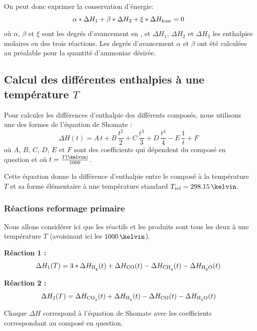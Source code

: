 \documentclass[a4paper,12pt]{article}
\begin{document}
On peut donc exprimer la conservation d'énergie:
$$\alpha*\Delta H_1 + \beta*\Delta H_2 + \xi*\Delta H_{\mbox{\scriptsize{four}}} = 0$$
où $\alpha$, $\beta$ et $\xi$ sont les degrés d'avancement en \mole\per\second,
et $\Delta H_1$, $\Delta H_2$ et $\Delta H_3$ les enthalpies molaires en
\joule\per\mole des trois réactions.
Les degrés d'avancement $\alpha$ et $\beta$ ont été calculées
au préalable pour la quantité d’ammoniac désirée.


\subsection{Calcul des différentes enthalpies à une température $T$}

Pour calculer les différences d'enthalpie des différents composés,
nous utilisons une des formes de l'équation de Shomate \cite{nist}:
$$\Delta H(t) = A\,t + B\,\frac{t^2}{2} + C\,\frac{t^3}{3}
+ D\,\frac{t^4}{4} - E\,\frac{1}{t} + F$$
où $A$, $B$, $C$, $D$, $E$ et $F$ sont des coefficients
qui dépendent du composé en question et où $t=\frac{T(\kelvin)}{1000}$.

Cette équation donne la différence d'enthalpie entre le composé à la température $T$
et sa forme élémentaire à une température standard $T\ind{ref} = 298.15\,\kelvin$.


\subsubsection{Réactions reformage primaire}

Nous allons considérer ici que les réactifs et les produits sont tous les deux
à une température $T$ (avoisinant ici les $1000\,\kelvin$).


\textbf{Réaction 1 :}  
\begin{equation*}
    \Delta H_1 (T) = 3*\Delta H_{\ce{H2}} (t)
    + \Delta H_{\ce{CO}} (t)
    - \Delta H_{\ce{CH4}} (t)
    - \Delta H_{\ce{H2O}} (t) 
\end{equation*}

\textbf{Réaction 2 :}  
\begin{equation*}
    \Delta H_2 (T) = \Delta H_{\ce{CO2}} (t)
    + \Delta H_{\ce{H2}} (t)
    - \Delta H_{\ce{CO}} (t)
    - \Delta H_{\ce{H2O}} (t) 
\end{equation*}

Chaque $\Delta H$ correspond à l’équation de Shomate
avec les coefficients correspondant au composé en question.
\end{document}
